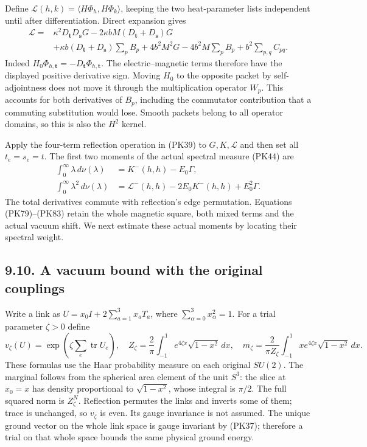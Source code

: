 \documentclass[11pt]{article}
\begin{document}
Define \(\mathcal L(h,k)=\langle H\Phi_h,H\Phi_k\rangle\), keeping the
two heat-parameter lists independent until after differentiation.
Direct expansion gives
\[
 \begin{split}
 \mathcal L
 ={}&\kappa^2D_{\mathbf t}D_{\mathbf s}G
 -2\kappa bM(D_{\mathbf t}+D_{\mathbf s})G\\
 &+\kappa b(D_{\mathbf t}+D_{\mathbf s})\sum_pB_p
 +4b^2M^2G-4b^2M\sum_pB_p+b^2\sum_{p,q}C_{pq}.
 \end{split}\tag{PK82}
\]
Indeed \(H_0\Phi_{h,\mathbf t}=-D_{\mathbf t}\Phi_{h,\mathbf t}\).
The electric–magnetic terms therefore have the displayed positive
derivative sign. Moving \(H_0\) to the opposite packet by self-adjointness
does not move it through the multiplication operator \(W_p\). This
accounts for both derivatives of \(B_p\), including the commutator
contribution that a commuting substitution would lose. Smooth packets
belong to all operator domains, so this is also the \(H^2\) kernel.

Apply the four-term reflection operation in (PK39) to \(G,K,\mathcal L\)
and then set all \(t_e=s_e=t\). The first two moments of the actual
spectral measure (PK44) are
\[
 \begin{split}
 \int_0^\infty\lambda\,d\nu(\lambda)
 &=K^-(h,h)-E_0\Gamma,\\
 \int_0^\infty\lambda^2\,d\nu(\lambda)
 &=\mathcal L^-(h,h)-2E_0K^-(h,h)+E_0^2\Gamma .
 \end{split}\tag{PK83}
\]
The total derivatives commute with reflection's edge permutation.
Equations (PK79)–(PK83) retain the whole magnetic square, both mixed
terms and the actual vacuum shift. We next estimate these actual
moments by locating their spectral weight.

\subsection*{9.10. A vacuum bound with the original couplings}

Write a link as \(U=x_0I+2\sum_{a=1}^3x_aT_a\), where
\(\sum_{\alpha=0}^3x_\alpha^2=1\). For a trial parameter \(\zeta>0\)
define
\[
 v_\zeta(U)=\exp\!\left(\zeta\sum_e\operatorname{tr}U_e\right),\quad
 Z_\zeta=\frac2\pi\int_{-1}^1
          e^{4\zeta x}\sqrt{1-x^2}\,dx,\quad
 m_\zeta=\frac{2}{\pi Z_\zeta}\int_{-1}^1
          x e^{4\zeta x}\sqrt{1-x^2}\,dx .
 \tag{PK84}
\]
These formulas use the Haar probability measure on each original
\(SU(2)\). The marginal follows from the spherical area element of
the unit \(S^3\): the slice at \(x_0=x\) has density proportional to
\(\sqrt{1-x^2}\), whose integral is \(\pi/2\).
The full squared norm is \(Z_\zeta^N\). Reflection permutes the links
and inverts some of them; trace is unchanged, so \(v_\zeta\) is even.
Its gauge invariance is not assumed. The unique ground vector on the
whole link space is gauge invariant by (PK37); therefore a trial on
that whole space bounds the same physical ground energy.
\end{document}
